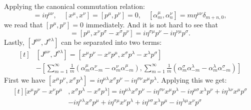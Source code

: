 \documentclass[12pt]{article}
\begin{document}
Applying the canonical commutation relation:
\begin{equation}
[x^\mu, p^\nu]=i\eta^{\mu\nu},\quad[x^\mu, x^\nu]=[p^\mu, p^\nu]=0,\quad[\alpha^\mu_m, \alpha^\nu_n]=m\eta^{\mu\nu}\delta_{m+n,0},
\end{equation}
we read that $[p^\mu, p^\nu]=0$ immediately. And it is not hard to see that
\begin{equation}
[p^\mu, J^{\nu\sigma}]=[p^\mu, x^\nu p^\sigma-x^\sigma p^\nu]=i\eta^{\sigma\mu}p^\nu-i\eta^{\nu\mu}p^\sigma.
\end{equation}
Lastly, $[J^{\mu\nu}, J^{\sigma\lambda}]$ can be separated into two terms:
\begin{equation}
\begin{aligned}[t]
&[J^{\mu\nu}, J^{\sigma\lambda}]=[x^\mu p^\nu-x^\nu p^\mu, x^\sigma p^\lambda-x^\lambda p^\sigma]\\
&-[\sum\limits_{m=1}^\infty\frac{1}{m}(\alpha_m^\mu \alpha_{-m}^\nu-\alpha_m^\nu \alpha_{-m}^\mu),\sum\limits_{m=1}^\infty\frac{1}{m}(\alpha_m^\sigma \alpha_{-m}^\lambda-\alpha_m^\lambda \alpha_{-m}^\sigma)]
\end{aligned}
\end{equation}
First we have $[x^\mu p^\nu,x^\sigma p^\lambda]=i\eta^{\mu\lambda}x^\sigma p^\nu-i\eta^{\sigma\nu}x^\mu p^\lambda$. Applying this we get:
\begin{equation}
\begin{aligned}[t]
[x^\mu p^\nu-x^\nu p^\mu &, x^\sigma p^\lambda-x^\sigma p^\lambda]=i\eta^{\mu\lambda}x^\sigma p^\nu-i\eta^{\sigma\nu}x^\mu p^\lambda-i\eta^{\mu\sigma}x^\lambda p^\nu+i\eta^{\lambda\nu}x^\mu p^\sigma\\
&-i\eta^{\nu\lambda}x^\sigma p^\mu+i\eta^{\sigma\mu}x^\nu p^\lambda+i\eta^{\nu\sigma}x^\lambda p^\mu-i\eta^{\lambda\mu}x^\nu p^\sigma
\end{aligned}
\end{equation}
\end{document}
